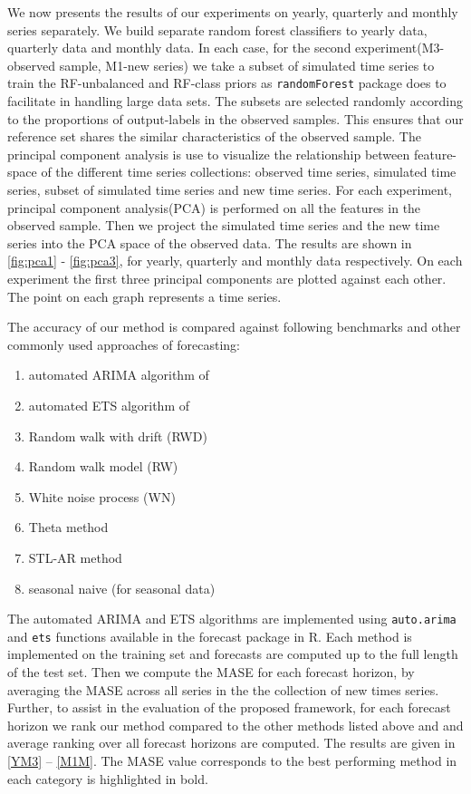 \documentclass[11pt,a4paper,]{article}
\providecommand{\tightlist}{%
  \setlength{\itemsep}{0pt}\setlength{\parskip}{0pt}}
\theoremstyle{definition}
\theoremstyle{definition}
\theoremstyle{definition}
\theoremstyle{remark}
\begin{document}
We now presents the results of our experiments on yearly, quarterly and
monthly series separately. We build separate random forest classifiers
to yearly data, quarterly data and monthly data. In each case, for the
second experiment(M3-observed sample, M1-new series) we take a subset of
simulated time series to train the RF-unbalanced and RF-class priors as
\texttt{randomForest} package does to facilitate in handling large data
sets. The subsets are selected randomly according to the proportions of
output-labels in the observed samples. This ensures that our reference
set shares the similar characteristics of the observed sample. The
principal component analysis is use to visualize the relationship
between feature-space of the different time series collections: observed
time series, simulated time series, subset of simulated time series and
new time series. For each experiment, principal component analysis(PCA)
is performed on all the features in the observed sample. Then we project
the simulated time series and the new time series into the PCA space of
the observed data. The results are shown in \autoref{fig:pca1} -
\autoref{fig:pca3}, for yearly, quarterly and monthly data respectively.
On each experiment the first three principal components are plotted
against each other. The point on each graph represents a time series.

The accuracy of our method is compared against following benchmarks and
other commonly used approaches of forecasting:

\begin{enumerate}
\def\labelenumi{\arabic{enumi}.}
\tightlist
\item
  automated ARIMA algorithm of \textcite{Hyndman2008}
\item
  automated ETS algorithm of \textcite{Hyndman2008}
\item
  Random walk with drift (RWD)
\item
  Random walk model (RW)
\item
  White noise process (WN)
\item
  Theta method
\item
  STL-AR method
\item
  seasonal naive (for seasonal data)
\end{enumerate}

The automated ARIMA and ETS algorithms are implemented using
\texttt{auto.arima} and \texttt{ets} functions available in the forecast
package in R\autocite{Hyndman2008}. Each method is implemented on the
training set and forecasts are computed up to the full length of the
test set. Then we compute the MASE for each forecast horizon, by
averaging the MASE across all series in the the collection of new times
series. Further, to assist in the evaluation of the proposed framework,
for each forecast horizon we rank our method compared to the other
methods listed above and and average ranking over all forecast horizons
are computed. The results are given in \autoref{YM3} -- \autoref{M1M}.
The MASE value corresponds to the best performing method in each
category is highlighted in bold.
\end{document}
